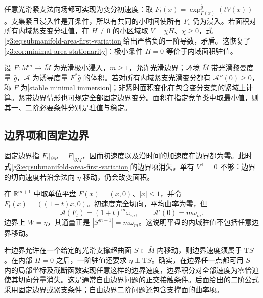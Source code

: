 \ProseParagraphBreak

任意光滑紧支法向场都可实现为变分初速度：取
\(F_t(x)=\exp_{F(x)}^{\bar g}(tV(x))\)。支集紧且浸入性是开条件，所以有共同的小时间使所有 \(F_t\) 仍为浸入。若面积对所有内域紧支变分驻值，在 \(H\ne0\) 的小区域取 \(V=\chi H\)、\(\chi\ge0\)，式\eqref{g3:eq:submanifold-area-first-variation}给出严格负的一阶导数，矛盾。这恢复了\cref{g3:cor:minimal-area-stationarity}：极小条件 \(H=0\) 等价于内域面积驻值。

\begin{definition}\label{g3:def:minimal-area-stability}
	设 \(F:M^m\to\bar M\) 为光滑极小浸入，\(m\ge1\)，允许光滑边界；环境 \(\bar M\) 带光滑黎曼度量 \(\bar g\)，\(\mathcal A\) 为诱导度量 \(F^*\bar g\) 的体积。若对所有内域紧支光滑变分都有 \(\mathcal A''(0)\ge0\)，称 \(F\) 为[stable minimal immersion]；非紧时面积变化在包含变分支集的紧域上计算。紧带边界情形也可规定全部固定边界变分。面积在指定竞争类中取最小值，则其一、二阶必要条件分别是驻值与稳定。
\end{definition}

\subsection{边界项和固定边界}
\label{g3:subsec:1901:02}
固定边界指 \(F_t|_{\partial M}=F|_{\partial M}\)，因而初速度以及沿时间的加速度在边界都为零。此时式\eqref{g3:eq:submanifold-area-first-variation}的边界项消失。单有 \(V^\perp=0\) 不够：边界的切向速度若沿余法向 \(\eta\) 移动，仍会改变面积。

\begin{example}\label{g3:exm:plane-disk-moving-boundary}
	在 \(\mathbb R^{m+1}\) 中取单位平盘 \(F(x)=(x,0)\)、\(|x|\le1\)，并令 \(F_t(x)=((1+t)x,0)\)。初速度完全切向，平均曲率为零，但
	\[
		\mathcal A(F_t)=(1+t)^m\omega_m,
		\qquad \mathcal A'(0)=m\omega_m.
	\]
	边界上 \(W=\eta\)，其通量正是 \(|S^{m-1}|=m\omega_m\)。这说明平盘的内域驻值不包括任意边界移动。
\end{example}

若边界允许在一个给定的光滑支撑超曲面 \(S\subset\bar M\) 内移动，则边界速度须属于 \(\mathrm TS\)。在内部 \(H=0\) 之后，一阶驻值还要求 \(\eta\perp\mathrm TS\)。确实，在边界任一点都可用 \(S\) 内的局部坐标及截断函数实现任意这样的边界速度，边界积分对全部速度为零恰迫使其切向分量消失。这是通常自由边界问题的正交接触条件。后面给出的二阶公式采用固定边界或紧支条件；自由边界二阶问题还包含支撑面的曲率项。

\ProseParagraphBreak


